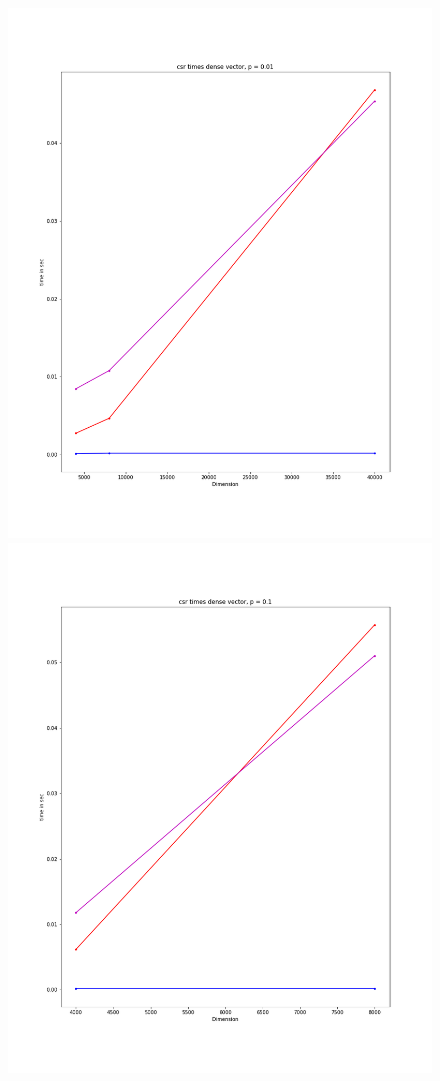 \documentclass[12pt]{article}
\begin{document}
\begin{figure}[h]
  \includegraphics[scale = 0.16]{csr_dv_01.png}
  \includegraphics[scale = 0.16]{csr_dv_1.png}
\end{figure}
\end{document}
